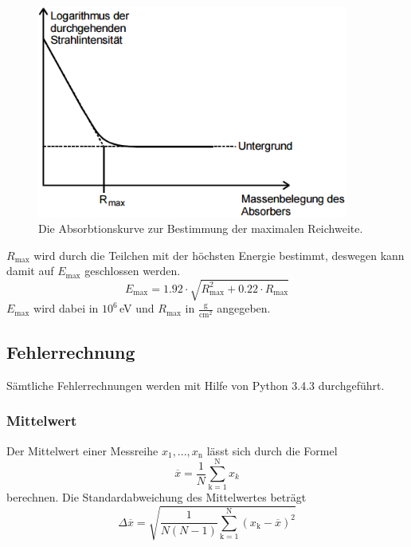 \begin{figure}[H]
	\centering
	\includegraphics[height=7cm]{picture/Absorbtionskurve.PNG}
	\caption{Die Absorbtionskurve zur Bestimmung der maximalen Reichweite. \cite[12]{sample}}
	\label{fig:Absorbtionskurve}
\end{figure}

$R_\text{max}$ wird durch die Teilchen mit der höchsten Energie bestimmt, deswegen kann damit auf $E_\text{max}$ geschlossen werden.
\begin{equation}
	E_\text{max} = 1.92 \cdot \sqrt{R^2_\text{max} + 0.22 \cdot R_\text{max}}
	\label{eqn:Emax}
\end{equation}
$E_\text{max}$ wird dabei in $10^6$\,eV und $R_\text{max}$ in $\frac{\text{g}}{\text{cm}^2}$ angegeben.
























\subsection{Fehlerrechnung}
Sämtliche Fehlerrechnungen werden mit Hilfe von Python 3.4.3 durchgeführt.
\subsubsection{Mittelwert}
Der Mittelwert einer Messreihe $x_\text{1}, ... ,x_\text{n}$ lässt sich durch die Formel
\begin{equation}
	\overline{x} = \frac{1}{N} \sum_{\text{k}=1}^\text{N} x_k
	\label{eqn:ave}
\end{equation}
berechnen. Die Standardabweichung des Mittelwertes beträgt
\begin{equation}
	\Delta \overline{x} = \sqrt{ \frac{1}{N(N-1)} \sum_{\text{k}=1}^\text{N} (x_\text{k} - \overline{x})^2}
	\label{eqn:std}
\end{equation}

